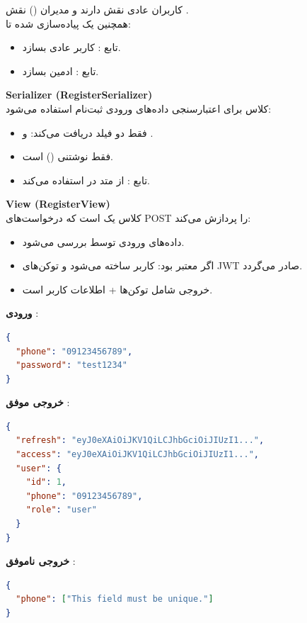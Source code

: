 \documentclass{report}
\begin{document}
کاربران عادی نقش  دارند و مدیران () نقش . \\
همچنین یک  پیاده‌سازی شده تا:
\begin{itemize}
  \item تابع : کاربر عادی بسازد.
  \item تابع : ادمین بسازد.
\end{itemize}




\textbf{Serializer (RegisterSerializer)} \\
کلاس  برای اعتبارسنجی داده‌های ورودی ثبت‌نام استفاده می‌شود:
\begin{itemize}
  \item فقط دو فیلد دریافت می‌کند:  و .
  \item {} فقط نوشتنی () است.
  \item تابع : از متد  در  استفاده می‌کند.
\end{itemize}



\textbf{View (RegisterView)} \\
کلاس  یک  است که درخواست‌های POST را پردازش می‌کند:
\begin{itemize}
  \item داده‌های ورودی توسط  بررسی می‌شود.
  \item اگر معتبر بود: کاربر ساخته می‌شود و توکن‌های JWT صادر می‌گردد.
  \item خروجی شامل توکن‌ها + اطلاعات کاربر است.
\end{itemize}



\textbf{ورودی }:
\begin{lstlisting}[language=json]
{
  "phone": "09123456789",
  "password": "test1234"
}
\end{lstlisting}

\textbf{خروجی موفق }:
\begin{lstlisting}[language=json]
{
  "refresh": "eyJ0eXAiOiJKV1QiLCJhbGciOiJIUzI1...",
  "access": "eyJ0eXAiOiJKV1QiLCJhbGciOiJIUzI1...",
  "user": {
    "id": 1,
    "phone": "09123456789",
    "role": "user"
  }
}
\end{lstlisting}

\textbf{خروجی ناموفق }:
\begin{lstlisting}[language=json]
{
  "phone": ["This field must be unique."]
}
\end{lstlisting}
\end{document}
